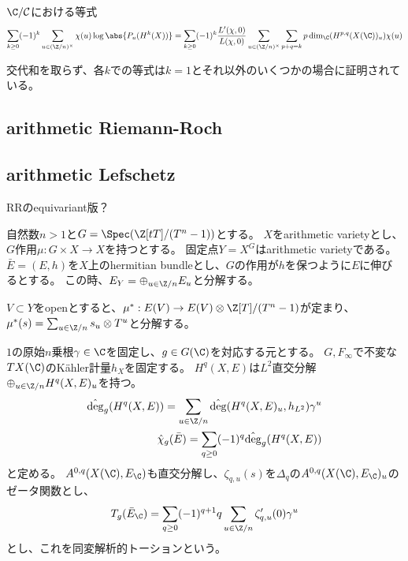 \documentclass{jsarticle}
\begin{document}
\begin{thm}[Theoreme 4.4]
$\C/\mathcal{C}$における等式
\begin{align*}
\sum_{k\geq0}(-1)^k\sum_{u\in(\Z/n)^\times}\chi(u)\log\abs{P_u(H^k(X))}
=\sum_{k\geq0}(-1)^k\frac{L'(\chi,0)}{L(\chi,0)}\sum_{u\in(\Z/n)^\times}\sum_{p+q=k}p\dim_\C(H^{p,q}(X(\C))_u)\chi(u)
\end{align*}
\end{thm}

交代和を取らず、各$k$での等式は$k=1$とそれ以外のいくつかの場合に証明されている。

\subsection{arithmetic Riemann-Roch}

\subsection{arithmetic Lefschetz}
RRのequivariant版？

自然数$n>1$と$G=\Spec(\Z[tT]/(T^n-1))$とする。
$X$をarithmetic varietyとし、$G$作用$\mu:G \times X \to X$を持つとする。
固定点$Y=X^G$はarithmetic varietyである。
$\bar{E}=(E,h)$を$X$上のhermitian bundleとし、$G$の作用が$h$を保つように$E$に伸びるとする。
この時、$E_Y=\oplus_{u\in\Z/n}E_u$と分解する。

$V\subset Y$をopenとすると、$\mu^*:E(V) \to E(V) \otimes \Z[T]/(T^n-1)$が定まり、
$\mu^*(s)=\sum_{u\in \Z/n}s_u\otimes T^u$と分解する。

$1$の原始$n$乗根$\gamma\in\C$を固定し、$g\in G(\C)$を対応する元とする。
$G, F_\infty$で不変な$TX(\C)$のK\"ahler計量$h_X$を固定する。
$H^q(X,E)$は$L^2$直交分解$\oplus_{u\in\Z/n}H^q(X,E)_u$を持つ。
\begin{align*}
\hat{\deg}_g(H^q(X,E))=\sum_{u\in\Z/n}\hat{\deg}(H^q(X,E)_u,h_{L^2})\gamma^u\\
\hat{\chi}_g(\bar{E})=\sum_{q\geq0}(-1)^q\hat{\deg}_g(H^q(X,E))
\end{align*}
と定める。
$A^{0,q}(X(\C),E_\C)$も直交分解し、$\zeta_{q,u}(s)$を$\Delta_q$の$A^{0,q}(X(\C),E_\C)_u$のゼータ関数とし、
\begin{align*}
T_g(\bar{E}_\C)=\sum_{q\geq0}(-1)^{q+1}q\sum_{u\in\Z/n}\zeta'_{q,u}(0)\gamma^u
\end{align*}
とし、これを同変解析的トーションという。
\end{document}
